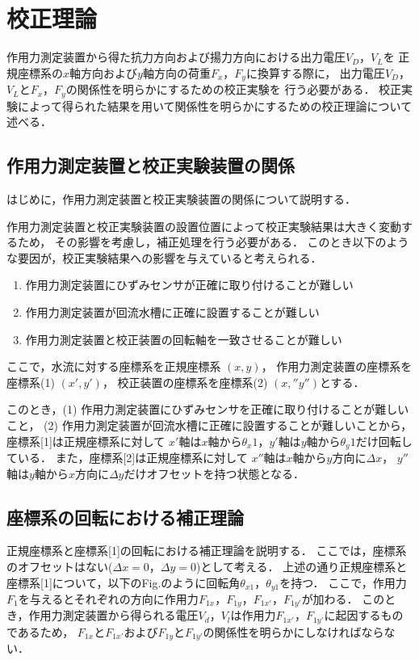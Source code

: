 \section{校正理論}
作用力測定装置から得た抗力方向および揚力方向における出力電圧$V_D$，$V_L$を
正規座標系の$x$軸方向および$y$軸方向の荷重$F_x$，$F_y$に換算する際に，
出力電圧$V_D$，$V_L$と$F_x$，$F_y$の関係性を明らかにするための校正実験を
行う必要がある．
校正実験によって得られた結果を用いて関係性を明らかにするための校正理論について述べる．

\subsection{作用力測定装置と校正実験装置の関係}
はじめに，作用力測定装置と校正実験装置の関係について説明する．

作用力測定装置と校正実験装置の設置位置によって校正実験結果は大きく変動するため，
その影響を考慮し，補正処理を行う必要がある．
このとき以下のような要因が，校正実験結果への影響を与えていると考えられる．

\begin{enumerate}[(1)]
    \item 作用力測定装置にひずみセンサが正確に取り付けることが難しい
    \item 作用力測定装置が回流水槽に正確に設置することが難しい
    \item 作用力測定装置と校正装置の回転軸を一致させることが難しい
\end{enumerate}

ここで，水流に対する座標系を正規座標系 $(x,y)$，
作用力測定装置の座標系を座標系(1) $(x',y')$，
校正装置の座標系を座標系(2) $(x,'' y'')$とする．

このとき，(1) 作用力測定装置にひずみセンサを正確に取り付けることが難しいこと，
(2) 作用力測定装置が回流水槽に正確に設置することが難しいことから，
座標系[1]は正規座標系に対して
$x'$軸は$x$軸から$\theta_x1$，$y'$軸は$y$軸から$\theta_y1$だけ回転している．
また，座標系[2]は正規座標系に対して
$x''$軸は$x$軸から$y$方向に$\Delta x$，
$y''$軸は$y$軸から$x$方向に$\Delta y$だけオフセットを持つ状態となる．

\newpage

\subsection{座標系の回転における補正理論}

正規座標系と座標系[1]の回転における補正理論を説明する．
ここでは，座標系のオフセットはない($\Delta x = 0$，$\Delta y = 0$)として考える．
上述の通り正規座標系と座標系[1]について，以下のFig.のように回転角$\theta_{x1}$，$\theta_{y1}$を持つ．
ここで，作用力$F_1$を与えるとそれぞれの方向に作用力$F_{1x}$，$F_{1y}$，$F_{1x'}$，$F_{1y'}$が加わる．
このとき，作用力測定装置から得られる電圧$V_d$，$V_l$は作用力$F_{1x'}$，$F_{1y'}$に起因するものであるため，
$F_{1x}$と$F_{1x'}$および$F_{1y}$と$F_{1y'}$の関係性を明らかにしなければならない．

